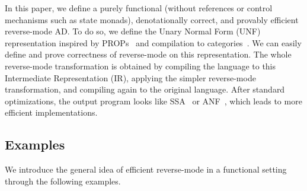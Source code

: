 


In this paper, we define a purely functional (without references or control mechanisms such as state monads), denotationally correct, and provably efficient reverse-mode AD. 
To do so, we define the Unary Normal Form (UNF) representation inspired by PROPs~\cite{maclane1965categorical} %
and compilation to categories~\cite{elliott2017compiling}.
We can easily define and prove correctness of reverse-mode on this representation. 
The whole reverse-mode transformation is obtained by compiling the language to this Intermediate Representation (IR), applying the simpler reverse-mode transformation, and compiling again to the original language.
After standard optimizations, the output program looks like SSA~\cite{cytron1989efficient} or ANF~\cite{sabry1993reasoning}, which leads to more efficient implementations.



\subsection{Examples}

We introduce the general idea of efficient reverse-mode in a functional setting through the following examples.

